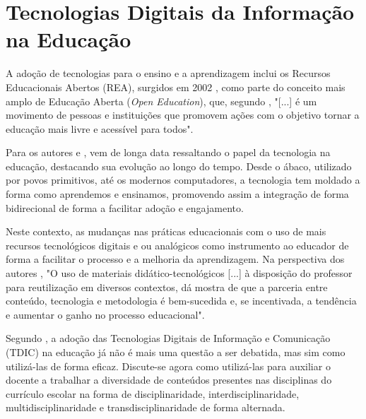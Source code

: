 






\section{Tecnologias Digitais da Informação na Educação}
\label{tics_educacao}

A adoção de tecnologias para o ensino e a aprendizagem inclui os Recursos Educacionais Abertos (REA), surgidos em 2002 \cite{unesco2020}, como parte do conceito mais amplo de Educação Aberta (\textit{Open Education}), que, segundo , "[...]  é um movimento de pessoas e instituições que promovem ações com o objetivo tornar a educação mais livre e acessível para todos".

Para os autores  e , vem de longa data ressaltando o papel da tecnologia na educação, destacando sua evolução ao longo do tempo. Desde o ábaco, utilizado por povos primitivos, até os modernos computadores, a tecnologia tem moldado a forma como aprendemos e ensinamos, promovendo assim a integração de forma bidirecional de forma a facilitar adoção e engajamento.

Neste contexto, as mudanças nas práticas educacionais com o uso de mais recursos tecnológicos digitais e ou analógicos como instrumento ao educador de forma a facilitar o processo e a melhoria da aprendizagem. Na perspectiva dos autores , "O uso de materiais didático-tecnológicos [...] à disposição do professor para reutilização em diversos contextos, dá mostra de que a parceria entre conteúdo, tecnologia e metodologia é bem-sucedida e, se incentivada, a tendência e aumentar o ganho no processo educacional".


Segundo , a adoção das Tecnologias Digitais de Informação e Comunicação (TDIC) na educação já não é mais uma questão a ser debatida, mas sim como utilizá-las de forma eficaz. Discute-se agora como utilizá-las para auxiliar o docente a trabalhar a diversidade de conteúdos presentes nas disciplinas do currículo escolar na forma de disciplinaridade, interdisciplinaridade, multidisciplinaridade e transdisciplinaridade de forma alternada.

